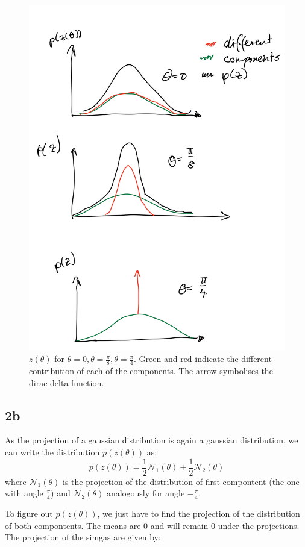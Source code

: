 \begin{figure}[H]
    \centering
    \includegraphics[width=0.8\linewidth]{z_theta.png}
    \caption{$z(\theta)$ for $\theta=0, \theta=\frac{\pi}{8}, \theta=\frac{\pi}{4}$.
    Green and red indicate the different contribution of each of the components.
    The arrow symbolises the dirac delta function.}
    \label{fig:z_theta}
\end{figure}

\subsection*{2b}

As the projection of a gaussian distribution is again a gaussian distribution,
we can write the distribution $p(z(\theta))$ as:
\begin{equation}
    p(z(\theta)) = \frac{1}{2} \mathcal{N}_1(\theta) + \frac{1}{2} \mathcal{N}_2(\theta)
\end{equation}
where $\mathcal{N}_1(\theta)$ is the projection of the distribution of first compontent (the one with angle $\frac{\pi}{4}$)
and $\mathcal{N}_2(\theta)$ analogously for angle $-\frac{\pi}{4}$.

To figure out $p(z(\theta))$, we just have to find the projection of the distribution of both compontents.
The means are 0 and will remain 0 under the projections.
The projection of the simgas are given by:


